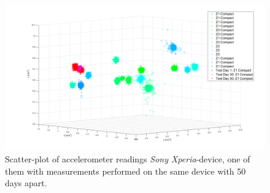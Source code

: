 \begin{figure}[H]
	\centering
	\includegraphics[scale=.3]{img/senrec-sony_scatter-2}
	\caption{Scatter-plot of accelerometer readings \textit{Sony Xperia}-device, one of them with measurements performed on the same device with 50 days apart.}
	\label{fig:scatterSony50days}
\end{figure} 

